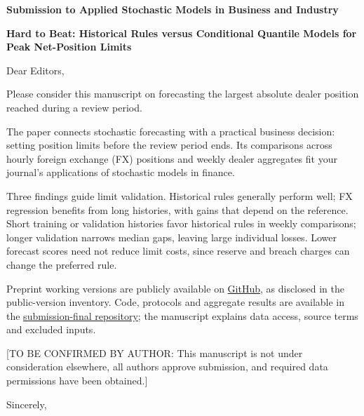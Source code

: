 \documentclass[11pt,a4paper]{article}
\begin{document}
\pagestyle{empty}
\setlength{\parindent}{0pt}
\setlength{\parskip}{10pt}
\textbf{Submission to Applied Stochastic Models in Business and Industry}\par
\textbf{Hard to Beat: Historical Rules versus Conditional Quantile Models for Peak Net-Position Limits}

Dear Editors,

Please consider this manuscript on forecasting the largest absolute dealer position reached during a review period.

The paper connects stochastic forecasting with a practical business decision: setting position limits before the review period ends. Its comparisons across hourly foreign exchange (FX) positions and weekly dealer aggregates fit your journal's applications of stochastic models in finance.

Three findings guide limit validation. Historical rules generally perform well; FX regression benefits from long histories, with gains that depend on the reference. Short training or validation histories favor historical rules in weekly comparisons; longer validation narrows median gaps, leaving large individual losses. Lower forecast scores need not reduce limit costs, since reserve and breach charges can change the preferred rule.

Preprint working versions are publicly available on \href{https://github.com/ByronLi0207/financial-mathematics-paper-20261020/blob/submission-final/notes/submission/public-versions.md}{GitHub}, as disclosed in the public-version inventory. Code, protocols and aggregate results are available in the \href{https://github.com/ByronLi0207/financial-mathematics-paper-20261020/tree/submission-final}{submission-final repository}; the manuscript explains data access, source terms and excluded inputs.

[TO BE CONFIRMED BY AUTHOR: This manuscript is not under consideration elsewhere, all authors approve submission, and required data permissions have been obtained.]

Sincerely,\par
[TO BE COMPLETED BY AUTHOR]
\end{document}
